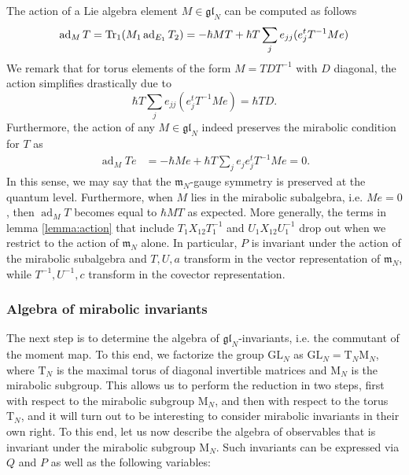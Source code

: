 \begin{remark}
The action of a Lie algebra element $M \in \mathfrak{gl}_N$ can be computed as follows
\begin{equation}
\operatorname{ad}_M T = \operatorname{Tr}_1(M_1 \operatorname{ad}_{E_1} T_2)
= - \hbar M T + \hbar T \sum_j e_{jj} (e_j^t T^{-1} M e)
\end{equation}
We remark that for torus elements of the form $M = TDT^{-1}$ with $D$ diagonal, the action simplifies drastically due to
\begin{equation}
\hbar T \sum_j e_{jj} (e_j^t T^{-1} M e) = \hbar TD.
\end{equation}
Furthermore, the action of any $M \in \mathfrak{gl}_N$ indeed preserves the mirabolic condition for $T$ as
\begin{equation}
\begin{aligned}
\operatorname{ad}_M Te
&= - \hbar M e + \hbar T \sum_j e_j e_j^t T^{-1} M e = 0.
\end{aligned}
\end{equation}
In this sense, we may say that the $\mathfrak{m}_N$-gauge symmetry is preserved at the quantum level. Furthermore, when $M$ lies in the mirabolic subalgebra, i.e. $Me = 0$, then $\operatorname{ad}_M T$ becomes equal to $\hbar MT$ as expected. More generally, the terms in lemma \ref{lemma:action} that include $T_1 X_{12} T_1^{-1}$ and $U_1 X_{12} U_1^{-1}$ drop out when we restrict to the action of $\mathfrak{m}_N$ alone. In particular, $P$ is invariant under the action of the mirabolic subalgebra and $T,U,a$ transform in the vector representation of $\mathfrak{m}_N$, while $T^{-1},U^{-1},c$ transform in the covector representation.
\end{remark}

\subsubsection{Algebra of mirabolic invariants}

The next step is to determine the algebra of $\mathfrak{gl}_N$-invariants, i.e. the commutant of the moment map. To this end, we factorize the group $\mathrm{GL}_N$ as $\mathrm{GL}_N = \mathrm{T}_N \mathrm{M}_N$, where $\mathrm{T}_N$ is the maximal torus of diagonal invertible matrices and $\mathrm{M}_N$ is the mirabolic subgroup. This allows us to perform the reduction in two steps, first with respect to the mirabolic subgroup $\mathrm{M}_N$, and then with respect to the torus $\mathrm{T}_N$, and it will turn out to be interesting to consider mirabolic invariants in their own right. To this end, let us now describe the algebra of observables that is invariant under the mirabolic subgroup $\mathrm{M}_N$. Such invariants can be expressed via $Q$ and $P$ as well as the following variables:

